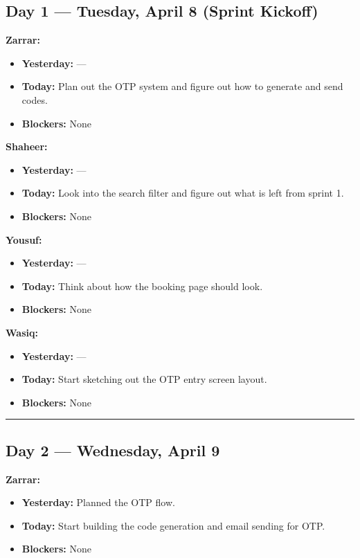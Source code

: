\documentclass[12pt,a4paper]{article}
\begin{document}
\subsection*{Day 1 --- Tuesday, April 8 (Sprint Kickoff)}

\textbf{Zarrar:}
\begin{itemize}[noitemsep]
    \item \textbf{Yesterday:} ---
    \item \textbf{Today:} Plan out the OTP system and figure out how to generate and send codes.
    \item \textbf{Blockers:} None
\end{itemize}

\textbf{Shaheer:}
\begin{itemize}[noitemsep]
    \item \textbf{Yesterday:} ---
    \item \textbf{Today:} Look into the search filter and figure out what is left from sprint 1.
    \item \textbf{Blockers:} None
\end{itemize}

\textbf{Yousuf:}
\begin{itemize}[noitemsep]
    \item \textbf{Yesterday:} ---
    \item \textbf{Today:} Think about how the booking page should look.
    \item \textbf{Blockers:} None
\end{itemize}

\textbf{Wasiq:}
\begin{itemize}[noitemsep]
    \item \textbf{Yesterday:} ---
    \item \textbf{Today:} Start sketching out the OTP entry screen layout.
    \item \textbf{Blockers:} None
\end{itemize}

\vspace{1em}\hrule\vspace{1em}

\subsection*{Day 2 --- Wednesday, April 9}

\textbf{Zarrar:}
\begin{itemize}[noitemsep]
    \item \textbf{Yesterday:} Planned the OTP flow.
    \item \textbf{Today:} Start building the code generation and email sending for OTP.
    \item \textbf{Blockers:} None
\end{itemize}
\end{document}

